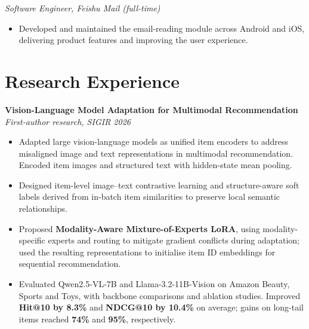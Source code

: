 \documentclass{resume}
\begin{document}
\vspace{0.4em}
\textit{Software Engineer, Feishu Mail \textnormal{(full-time)}}
\begin{itemize}
  \item Developed and maintained the email-reading module across Android and iOS, delivering product features and improving the user experience.
\end{itemize}

\section{Research Experience}
\textbf{Vision-Language Model Adaptation for Multimodal Recommendation}\\
\textit{First-author research, SIGIR 2026}
\begin{itemize}
  \item Adapted large vision-language models as unified item encoders to address misaligned image and text representations in multimodal recommendation. Encoded item images and structured text with hidden-state mean pooling.
  \item Designed item-level image--text contrastive learning and structure-aware soft labels derived from in-batch item similarities to preserve local semantic relationships.
  \item Proposed \textbf{Modality-Aware Mixture-of-Experts LoRA}, using modality-specific experts and routing to mitigate gradient conflicts during adaptation; used the resulting representations to initialise item ID embeddings for sequential recommendation.
  \item Evaluated Qwen2.5-VL-7B and Llama-3.2-11B-Vision on Amazon Beauty, Sports and Toys, with backbone comparisons and ablation studies. Improved \textbf{Hit@10 by 8.3\%} and \textbf{NDCG@10 by 10.4\%} on average; gains on long-tail items reached \textbf{74\%} and \textbf{95\%}, respectively.
\end{itemize}
\end{document}
